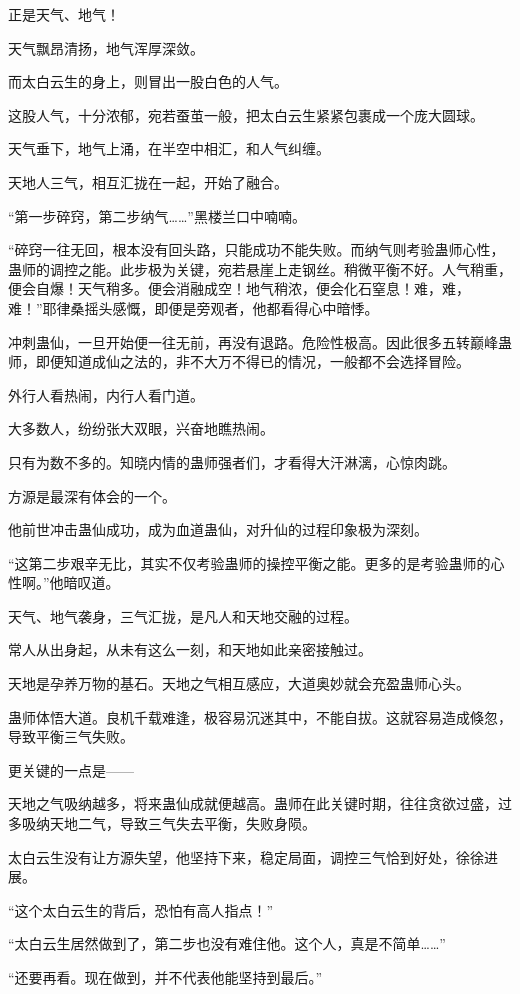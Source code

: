 \begin{this_body}
正是天气、地气！

天气飘昂清扬，地气浑厚深敛。

而太白云生的身上，则冒出一股白色的人气。

这股人气，十分浓郁，宛若蚕茧一般，把太白云生紧紧包裹成一个庞大圆球。

天气垂下，地气上涌，在半空中相汇，和人气纠缠。

天地人三气，相互汇拢在一起，开始了融合。

“第一步碎窍，第二步纳气……”黑楼兰口中喃喃。

“碎窍一往无回，根本没有回头路，只能成功不能失败。而纳气则考验蛊师心性，蛊师的调控之能。此步极为关键，宛若悬崖上走钢丝。稍微平衡不好。人气稍重，便会自爆！天气稍多。便会消融成空！地气稍浓，便会化石窒息！难，难，难！”耶律桑摇头感慨，即便是旁观者，他都看得心中暗悸。

冲刺蛊仙，一旦开始便一往无前，再没有退路。危险性极高。因此很多五转巅峰蛊师，即便知道成仙之法的，非不大万不得已的情况，一般都不会选择冒险。

外行人看热闹，内行人看门道。

大多数人，纷纷张大双眼，兴奋地瞧热闹。

只有为数不多的。知晓内情的蛊师强者们，才看得大汗淋漓，心惊肉跳。

方源是最深有体会的一个。

他前世冲击蛊仙成功，成为血道蛊仙，对升仙的过程印象极为深刻。

“这第二步艰辛无比，其实不仅考验蛊师的操控平衡之能。更多的是考验蛊师的心性啊。”他暗叹道。

天气、地气袭身，三气汇拢，是凡人和天地交融的过程。

常人从出身起，从未有这么一刻，和天地如此亲密接触过。

天地是孕养万物的基石。天地之气相互感应，大道奥妙就会充盈蛊师心头。

蛊师体悟大道。良机千载难逢，极容易沉迷其中，不能自拔。这就容易造成倏忽，导致平衡三气失败。

更关键的一点是——

天地之气吸纳越多，将来蛊仙成就便越高。蛊师在此关键时期，往往贪欲过盛，过多吸纳天地二气，导致三气失去平衡，失败身陨。

太白云生没有让方源失望，他坚持下来，稳定局面，调控三气恰到好处，徐徐进展。

“这个太白云生的背后，恐怕有高人指点！”

“太白云生居然做到了，第二步也没有难住他。这个人，真是不简单……”

“还要再看。现在做到，并不代表他能坚持到最后。”


\end{this_body}
